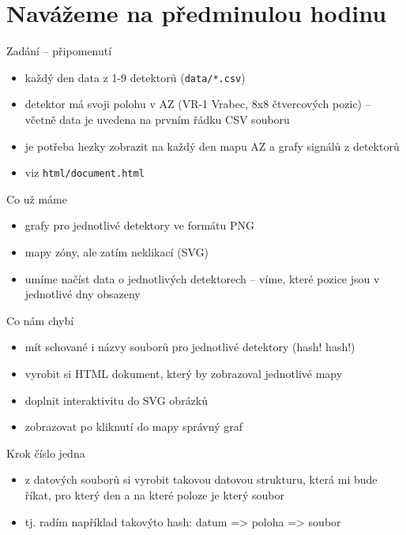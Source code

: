 \documentclass{beamer}
\begin{document}
\section{Navážeme na předminulou hodinu}

\begin{frame}{Zadání -- připomenutí}
  \begin{itemize}
    \item každý den data z 1-9 detektorů (\texttt{data/*.csv})
    \item detektor má svoji polohu v AZ (VR-1 Vrabec, 8x8 čtvercových pozic) -- včetně data je uvedena na prvním řádku CSV souboru
    \item je potřeba hezky zobrazit na každý den mapu AZ a grafy signálů z detektorů
    \item viz \texttt{html/document.html}
  \end{itemize}
\end{frame}

\begin{frame}{Co už máme}
  \begin{itemize}
    \item grafy pro jednotlivé detektory ve formátu PNG
    \item mapy zóny, ale zatím neklikací (SVG)
    \item umíme načíst data o jednotlivých detektorech -- víme, které pozice jsou v jednotlivé dny obsazeny
  \end{itemize}
\end{frame}

\begin{frame}{Co nám chybí}
  \begin{itemize}
    \item mít schované i názvy souborů pro jednotlivé detektory (hash! hash!)
    \item vyrobit si HTML dokument, který by zobrazoval jednotlivé mapy
    \item doplnit interaktivitu do SVG obrázků
    \item zobrazovat po kliknutí do mapy správný graf
  \end{itemize}
\end{frame}

\begin{frame}{Krok číslo jedna}
  \begin{itemize}
    \item z datových souborů si vyrobit takovou datovou strukturu, která mi bude říkat, pro který den a na které poloze je který soubor
    \item tj. radím například takovýto hash: {datum => {poloha => soubor}}
  \end{itemize}
\end{frame}
\end{document}
